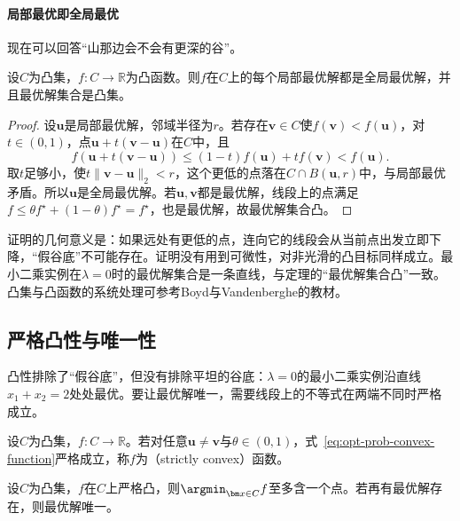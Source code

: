 \paragraph{局部最优即全局最优}
现在可以回答“山那边会不会有更深的谷”。

\begin{theorem}[凸问题的局部最优是全局最优]
\label{thm:opt-prob-local-global}
设$C$为凸集，$f:C\to\mathbb R$为凸函数。则$f$在$C$上的每个局部最优解都是全局最优解，并且最优解集合是凸集。
\end{theorem}

\begin{proof}
设$\bm u$是局部最优解，邻域半径为$r$。若存在$\bm v\in C$使$f(\bm v)<f(\bm u)$，对$t\in(0,1)$，点$\bm u+t(\bm v-\bm u)$在$C$中，且
\[
  f(\bm u+t(\bm v-\bm u))\leq(1-t)f(\bm u)+tf(\bm v)<f(\bm u).
\]
取$t$足够小，使$t\lVert\bm v-\bm u\rVert_2<r$，这个更低的点落在$C\cap B(\bm u,r)$中，与局部最优矛盾。所以$\bm u$是全局最优解。若$\bm u,\bm v$都是最优解，线段上的点满足$f\leq\theta f^\star+(1-\theta)f^\star=f^\star$，也是最优解，故最优解集合凸。
\end{proof}

证明的几何意义是：如果远处有更低的点，连向它的线段会从当前点出发立即下降，“假谷底”不可能存在。证明没有用到可微性，对非光滑的凸目标同样成立。最小二乘实例在$\lambda=0$时的最优解集合是一条直线，与定理的“最优解集合凸”一致。凸集与凸函数的系统处理可参考Boyd与Vandenberghe的教材。

\subsection{严格凸性与唯一性}
\label{sec:opt-prob-strict-convexity}

凸性排除了“假谷底”，但没有排除平坦的谷底：$\lambda=0$的最小二乘实例沿直线$x_1+x_2=2$处处最优。要让最优解唯一，需要线段上的不等式在两端不同时严格成立。

\begin{definition}[严格凸函数]
\label{def:opt-prob-strict-convex}
设$C$为凸集，$f:C\to\mathbb R$。若对任意$\bm u\neq\bm v$与$\theta\in(0,1)$，式~\eqref{eq:opt-prob-convex-function}严格成立，称$f$为（strictly convex）函数。
\end{definition}

\begin{theorem}[严格凸目标至多有一个最小点]
\label{thm:opt-prob-strict-unique}
设$C$为凸集，$f$在$C$上严格凸，则$\argmin_{\bm x\in C}f$至多含一个点。若再有最优解存在，则最优解唯一。
\end{theorem}

